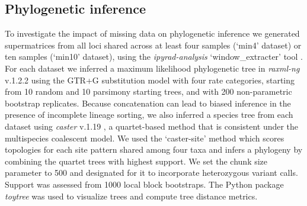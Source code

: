 \documentclass[11pt]{article}
\begin{document}
\subsection{Phylogenetic inference}
To investigate the impact of missing data on phylogenetic inference 
we generated supermatrices from all loci shared across at least four 
samples (`min4' dataset) or ten samples (`min10' dataset), using the
\emph{ipyrad-analysis} ‘window\_extracter’ tool \citep{eaton_ipyrad_2020}.
% 
For each dataset we inferred a maximum likelihood phylogenetic tree in
\emph{raxml-ng} v.1.2.2 \citep{kozlov_raxml-ng_2019} using the GTR+G substitution
model with four rate categories, starting from 10 random and 10 parsimony 
starting trees, and with 200 non-parametric bootstrap replicates. 
% 
Because concatenation can lead to biased inference in the presence of incomplete
lineage sorting, we also inferred a species tree from each dataset using 
\emph{caster} v.1.19 \citep{doi:10.1126/science.adk9688}, 
a quartet-based method that is consistent under the multispecies coalescent model. 
We used the `caster-site’ method which scores topologies for each site pattern 
shared among four taxa and infers a phylogeny by combining the quartet
trees with highest support. We set the chunk size parameter to 500 
and designated for it to incorporate heterozygous variant calls.
Support was assessed from 1000 local block bootstraps. 
The Python package \emph{toytree} \citep{eaton_toytree_2020} was used to 
visualize trees and compute tree distance metrics.

\end{document}
